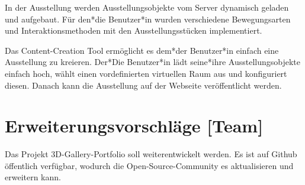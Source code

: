 In der Ausstellung werden Ausstellungsobjekte vom Server dynamisch geladen und aufgebaut. Für den*die Benutzer*in wurden verschiedene Bewegungsarten und Interaktionsmethoden mit den Ausstellungsstücken implementiert.

Das Content-Creation Tool ermöglicht es dem*der Benutzer*in einfach eine Ausstellung zu kreieren. Der*Die Benutzer*in lädt seine*ihre Ausstellungsobjekte einfach hoch, wählt einen vordefinierten virtuellen Raum aus und konfiguriert diesen. Danach kann die Ausstellung auf der Webseite veröffentlicht werden.

\section{Erweiterungsvorschläge [Team]} 
Das Projekt 3D-Gallery-Portfolio soll weiterentwickelt werden. Es ist auf Github öffentlich verfügbar, wodurch die Open-Source-Community es aktualisieren und erweitern kann.